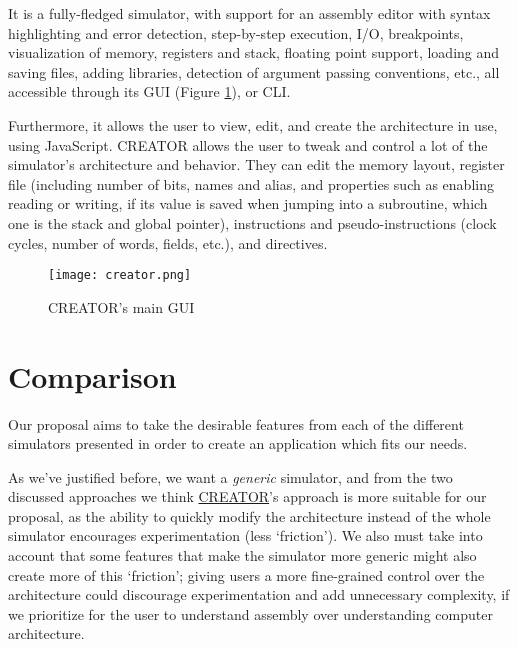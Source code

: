 It is a fully-fledged simulator, with support for an \gls{assembly} editor with syntax highlighting and error detection, step-by-step execution, \gls{I/O}, breakpoints, visualization of \gls{memory}, \glspl{register} and \gls{stack}, floating point support, loading and saving files, adding libraries, detection of argument passing conventions, etc., all accessible through its \gls{GUI} (Figure \ref{fig:creator}), or \gls{CLI}.

Furthermore, it allows the user to view, edit, and create the architecture in use, using JavaScript. CREATOR allows the user to tweak and control a lot of the simulator's architecture and behavior. They can edit the \gls{memory} layout, register file (including number of bits, names and alias, and properties such as enabling reading or writing, if its value is saved when jumping into a \gls{subroutine}, which one is the stack and global pointer), \glspl{instruction} and \glspl{pseudo-instruction} (\glspl{clock cycle}, number of words, fields, etc.), and \glspl{directive}.


\begin{figure}[h]
  \caption[CREATOR's main GUI]{CREATOR's main \gls{GUI}}
  \texttt{[image: creator.png]}
  \label{fig:creator}
\end{figure}



\section{Comparison}\label{sec:comparison}
Our proposal aims to take the desirable features from each of the different simulators presented in order to create an application which fits our needs.

As we've justified before, we want a \textit{generic} simulator, and from the two discussed approaches we think \hyperref[subsubsec:creator]{CREATOR}'s approach is more suitable for our proposal, as the ability to quickly modify the architecture instead of  the whole simulator encourages experimentation (less `friction'). We also must take into account that some features that make the simulator more generic might also create more of this `friction'; giving users a more fine-grained control over the architecture could discourage experimentation and add unnecessary complexity, if we prioritize for the user to understand \gls{assembly} over understanding computer architecture.  %

